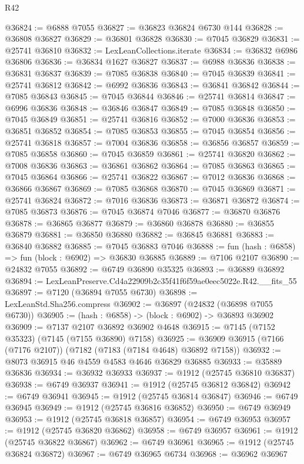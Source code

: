 \begin{lexlean}{R42}
\begin{coremodule}
{@36824 := @6888 @7055
@36827 := @36823 @36824 @6730 @144
@36828 := @36808 @36827
@36829 := @36801 @36828
@36830 := @7045 @36829
@36831 := @25741 @36810
@36832 := LexLeanCollections.iterate
@36834 := @36832 @6986 @36806
@36836 := @36834 @1627 @36827
@36837 := @6988 @36836
@36838 := @36831 @36837
@36839 := @7085 @36838
@36840 := @7045 @36839
@36841 := @25741 @36812
@36842 := @6992 @36836
@36843 := @36841 @36842
@36844 := @7085 @36843
@36845 := @7045 @36844
@36846 := @25741 @36814
@36847 := @6996 @36836
@36848 := @36846 @36847
@36849 := @7085 @36848
@36850 := @7045 @36849
@36851 := @25741 @36816
@36852 := @7000 @36836
@36853 := @36851 @36852
@36854 := @7085 @36853
@36855 := @7045 @36854
@36856 := @25741 @36818
@36857 := @7004 @36836
@36858 := @36856 @36857
@36859 := @7085 @36858
@36860 := @7045 @36859
@36861 := @25741 @36820
@36862 := @7008 @36836
@36863 := @36861 @36862
@36864 := @7085 @36863
@36865 := @7045 @36864
@36866 := @25741 @36822
@36867 := @7012 @36836
@36868 := @36866 @36867
@36869 := @7085 @36868
@36870 := @7045 @36869
@36871 := @25741 @36824
@36872 := @7016 @36836
@36873 := @36871 @36872
@36874 := @7085 @36873
@36876 := @7045 @36874 @7046
@36877 := @36870 @36876
@36878 := @36865 @36877
@36879 := @36860 @36878
@36880 := @36855 @36879
@36881 := @36850 @36880
@36882 := @36845 @36881
@36883 := @36840 @36882
@36885 := @7045 @36883 @7046
@36888 := fun (hash : @6858) => fun (block : @6902) => @36830 @36885
@36889 := @7106 @2107
@36890 := @24832 @7055
@36892 := @6749 @36890 @35325
@36893 := @36889 @36892
@36894 := LexLeanPreserve.Cd4a22909b2c35f41f6f59ae0eec5022e.R42.__fits_55
@36897 := @7120 (@36894 @7055 @6730)
@36898 := LexLeanStd.Sha256.compress
@36902 := @36897 (@24832 (@36898 @7055 @6730))
@36905 := (hash : @6858) -> (block : @6902) -> @36893 @36902
@36909 := @7137 @2107 @36892 @36902 @4648
@36915 := @7145 (@7152 @35323) (@7145 (@7155 @36890) @7158)
@36925 := @36909 @36915 (@7166 (@7176 @2107)) (@7182 (@7183 (@7184 @4648) @36892 @7158))
@36932 := @8073 @36915 @46 @4559 @4583 @4646 @36829 @36885
@36933 := @35889 @36836
@36934 := @36932 @36933
@36937 := @1912 (@25745 @36810 @36837)
@36938 := @6749 @36937
@36941 := @1912 (@25745 @36812 @36842)
@36942 := @6749 @36941
@36945 := @1912 (@25745 @36814 @36847)
@36946 := @6749 @36945
@36949 := @1912 (@25745 @36816 @36852)
@36950 := @6749 @36949
@36953 := @1912 (@25745 @36818 @36857)
@36954 := @6749 @36953
@36957 := @1912 (@25745 @36820 @36862)
@36958 := @6749 @36957
@36961 := @1912 (@25745 @36822 @36867)
@36962 := @6749 @36961
@36965 := @1912 (@25745 @36824 @36872)
@36967 := @6749 @36965 @6734
@36968 := @36962 @36967
}
\end{coremodule}
\end{lexlean}
